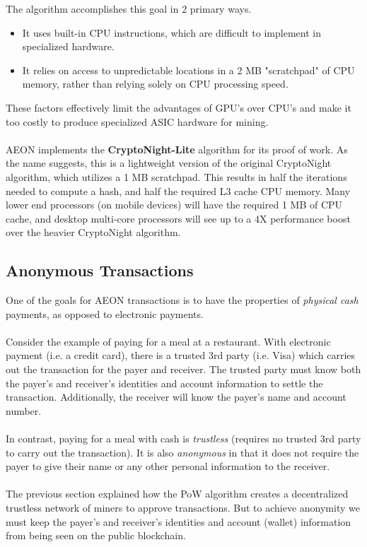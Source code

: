 The algorithm accomplishes this goal in 2 primary ways.
\begin{itemize}
	\item It uses built-in CPU instructions, which are difficult to implement in specialized hardware.
	\item It relies on access to unpredictable locations in a 2 MB "scratchpad" of CPU memory, rather than relying solely on CPU processing speed.
\end{itemize}
These factors effectively limit the advantages of GPU's over CPU's and make it too costly to produce specialized ASIC hardware for mining.\\
\\
AEON implements the \textbf{CryptoNight-Lite} algorithm for its proof of work. As the name suggests, this is a lightweight version of the original CryptoNight algorithm, which utilizes a 1 MB scratchpad.  This results in half the iterations needed to compute a hash, and half the required L3 cache CPU memory.  Many lower end processors (on mobile devices) will have the required 1 MB of CPU cache, and desktop multi-core processors will see up to a 4X performance boost over the heavier CryptoNight algorithm.

\subsection{Anonymous Transactions}
One of the goals for AEON transactions is to have the properties of \textit{physical cash} payments, as opposed to electronic payments.\\
\\
Consider the example of paying for a meal at a restaurant. With electronic payment (i.e. a credit card), there is a trusted 3rd party (i.e. Visa) which carries out the transaction for the payer and receiver. The trusted party must know both the payer's and receiver's identities and account information to settle the transaction. Additionally, the receiver will know the payer's name and account number.\\
\\
In contrast, paying for a meal with cash is \textit{trustless} (requires no trusted 3rd party to carry out the transaction). It is also \textit{anonymous} in that it does not require the payer to give their name or any other personal information to the receiver.\\
\\
The previous section explained how the PoW algorithm creates a decentralized trustless network of miners to approve transactions.  But to achieve anonymity we must keep the payer's and receiver's identities and account (wallet) information from being seen on the public blockchain.

